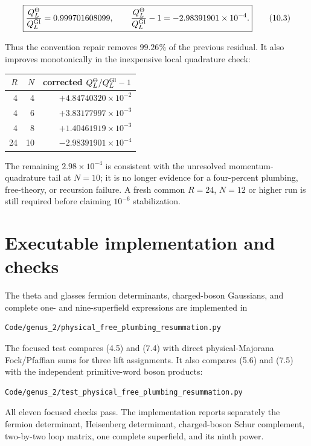 \documentclass[11pt]{article}
\begin{document}
\[
 \boxed{\frac{Q_L^\Theta}{Q_L^{\rm Gl}}
 =0.999701608099,\qquad
 \frac{Q_L^\Theta}{Q_L^{\rm Gl}}-1
 =-2.98391901\times10^{-4}.}
\tag{10.3}
\]

Thus the convention repair removes \(99.26\%\) of the previous residual.
It also improves monotonically in the inexpensive local quadrature check:

\begin{center}
\small
\begin{tabular}{rrr}
\toprule
\(R\) & \(N\) & corrected \(Q_L^\Theta/Q_L^{\rm Gl}-1\) \\
\midrule
4 & 4 & \(+4.84740320\times10^{-2}\) \\
4 & 6 & \(+3.83177997\times10^{-3}\) \\
4 & 8 & \(+1.40461919\times10^{-3}\) \\
24 & 10 & \(-2.98391901\times10^{-4}\) \\
\bottomrule
\end{tabular}
\end{center}

The remaining \(2.98\times10^{-4}\) is consistent with the unresolved
momentum-quadrature tail at \(N=10\); it is no longer evidence for a
four-percent plumbing, free-theory, or recursion failure.  A fresh common
\(R=24\), \(N=12\) or higher run is still required before claiming
\(10^{-6}\) stabilization.

\section{Executable implementation and checks}

The theta and glasses fermion determinants, charged-boson Gaussians, and
complete one- and nine-superfield expressions are implemented in

\begin{verbatim}
Code/genus_2/physical_free_plumbing_resummation.py
\end{verbatim}

The focused test compares (4.5) and (7.4) with direct physical-Majorana
Fock/Pfaffian sums for three lift assignments.  It also compares (5.6) and
(7.5) with the independent primitive-word boson products:

\begin{verbatim}
Code/genus_2/test_physical_free_plumbing_resummation.py
\end{verbatim}

All eleven focused checks pass.  The implementation reports separately the
fermion determinant, Heisenberg determinant, charged-boson Schur complement,
two-by-two loop matrix, one complete superfield, and its ninth power.
\end{document}
